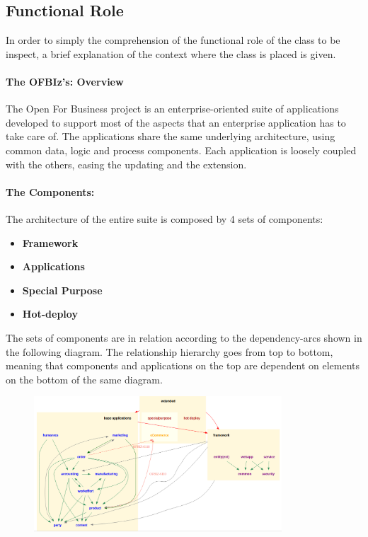 \subsection{Functional Role}

In order to simply the comprehension of the functional role of the class to be inspect, a brief explanation of the context where the class is placed is given.

\paragraph{The OFBIz's: Overview}
The Open For Business project is an enterprise-oriented suite of applications developed to support most of the aspects that an enterprise application has to take care of.
The applications share the same underlying architecture, using common data, logic and process components.
Each application is loosely coupled with the others, easing the updating and the extension.


\paragraph{The Components:}

The architecture of the entire suite is composed by 4 sets of components:
\begin{itemize}
	\item \textbf{Framework}
	\item \textbf{Applications}
	\item \textbf{Special Purpose}
	\item \textbf{Hot-deploy}
\end{itemize}

The sets of components are in relation according to the dependency-arcs shown in the following diagram.
The relationship hierarchy goes from top to bottom, meaning that components and applications on the top are dependent on elements on the bottom of the same diagram.

\begin{figure}[H]
	\centerline{
		\includegraphics[width=350px]{../Datas/images/dependencies.png}
	}
\end{figure}

